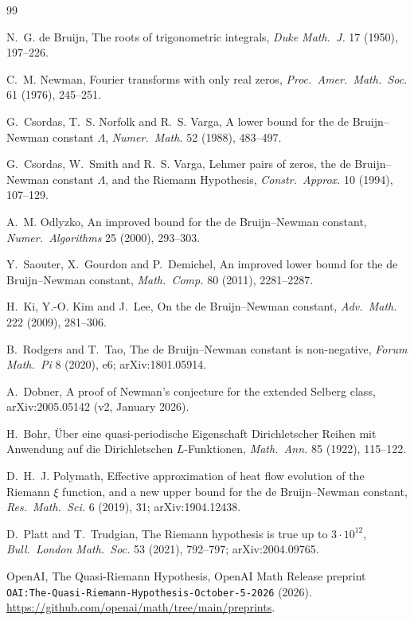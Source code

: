 \documentclass[11pt]{article}
\theoremstyle{definition}
\begin{document}
\begin{thebibliography}{99}\small

 N.~G. de Bruijn, The roots of trigonometric integrals, \emph{Duke Math.\ J.} 17 (1950), 197--226.

 C.~M. Newman, Fourier transforms with only real zeros, \emph{Proc.\ Amer.\ Math.\ Soc.} 61 (1976), 245--251.

 G.~Csordas, T.~S. Norfolk and R.~S. Varga, A lower bound for the de Bruijn--Newman constant $\Lambda$, \emph{Numer.\ Math.} 52 (1988), 483--497.

 G.~Csordas, W.~Smith and R.~S. Varga, Lehmer pairs of zeros, the de Bruijn--Newman constant $\Lambda$, and the Riemann Hypothesis, \emph{Constr.\ Approx.} 10 (1994), 107--129.

 A.~M. Odlyzko, An improved bound for the de Bruijn--Newman constant, \emph{Numer.\ Algorithms} 25 (2000), 293--303.

 Y.~Saouter, X.~Gourdon and P.~Demichel, An improved lower bound for the de Bruijn--Newman constant, \emph{Math.\ Comp.} 80 (2011), 2281--2287.

 H.~Ki, Y.-O. Kim and J.~Lee, On the de Bruijn--Newman constant, \emph{Adv.\ Math.} 222 (2009), 281--306.

 B.~Rodgers and T.~Tao, The de Bruijn--Newman constant is non-negative, \emph{Forum Math.\ Pi} 8 (2020), e6; arXiv:1801.05914.

 A.~Dobner, A proof of Newman's conjecture for the extended Selberg class, arXiv:2005.05142 (v2, January 2026).

 H.~Bohr, \"Uber eine quasi-periodische Eigenschaft Dirichletscher Reihen mit Anwendung auf die Dirichletschen $L$-Funktionen, \emph{Math.\ Ann.} 85 (1922), 115--122.

 D.~H.~J. Polymath, Effective approximation of heat flow evolution of the Riemann $\xi$ function, and a new upper bound for the de Bruijn--Newman constant, \emph{Res.\ Math.\ Sci.} 6 (2019), 31; arXiv:1904.12438.

 D.~Platt and T.~Trudgian, The Riemann hypothesis is true up to $3 \cdot 10^{12}$, \emph{Bull.\ London Math.\ Soc.} 53 (2021), 792--797; arXiv:2004.09765.

 OpenAI, The Quasi-Riemann Hypothesis, OpenAI Math Release preprint \texttt{OAI:The-Quasi-Riemann-Hypothesis-October-5-2026} (2026). \url{https://github.com/openai/math/tree/main/preprints}.


\end{thebibliography}
\end{document}
